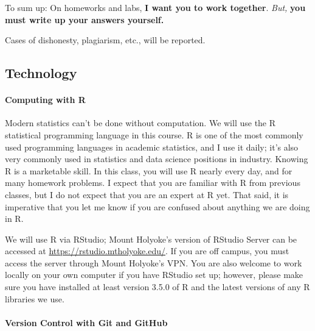\documentclass[11pt]{article}
\begin{document}
To sum up: On homeworks and labs, \textbf{I want you to work together}.  \emph{But,} \textbf{you must write up your answers yourself.}

Cases of dishonesty, plagiarism, etc., will be reported.

\subsection*{Technology}

\paragraph{Computing with R}

Modern statistics can't be done without computation.  We will use the R statistical programming language in this course.  R is one of the most commonly used programming languages in academic statistics, and I use it daily; it's also very commonly used in statistics and data science positions in industry.  Knowing R is a marketable skill.  In this class, you will use R nearly every day, and for many homework problems.  I expect that you are familiar with R from previous classes, but I do not expect that you are an expert at R yet.  That said, it is imperative that you let me know if you are confused about anything we are doing in R.

We will use R via RStudio; Mount Holyoke's version of RStudio Server can be accessed at \url{https://rstudio.mtholyoke.edu/}. If you are off campus, you must access the server through Mount Holyoke's VPN. You are also welcome to work locally on your own computer if you have RStudio set up; however, please make sure you have installed at least version 3.5.0 of R and the latest versions of any R libraries we use.


\paragraph{Version Control with Git and GitHub}
\end{document}
